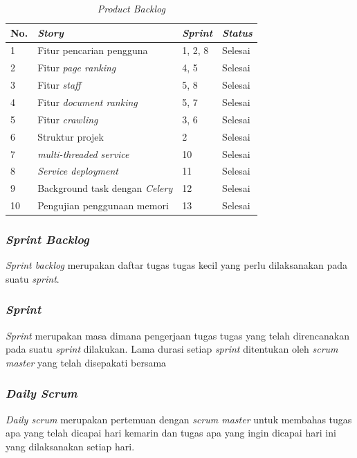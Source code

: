 \documentclass[
	a4paper, %
	10pt, %
	unnumberedsections, %
	twoside, %
]{LTJournalArticle}
\begin{document}
\begin{table}[H]
	\centering
	\caption{\textit{Product Backlog}}
	\label{table:productbacklog}
	\begin{tabular}{@{} |p{0.25cm}|p{3cm}| p{1cm} |p{1cm}|@{}}
		\hline
		\textbf{No.} & \textbf{\textit{Story}} & \textbf{\textit{Sprint}} & \textbf{\textit{Status}} \\
		\hline
		1 & Fitur pencarian pengguna & 1, 2, 8 & Selesai \\
		\hline
		2 & Fitur \textit{page ranking} & 4, 5 & Selesai\\
		\hline
		3 & Fitur \textit{staff} & 5, 8 & Selesai\\
		\hline
		4 & Fitur \textit{document ranking} & 5, 7  & Selesai\\
		\hline
		5 & Fitur \textit{crawling} & 3, 6 & Selesai\\
		\hline
		6 & Struktur projek & 2 & Selesai\\
		\hline
		7 & \textit{multi-threaded service} & 10  & Selesai\\
		\hline
		8 & \textit{Service deployment} & 11  & Selesai\\
		\hline
		9 & Background task dengan \textit{Celery} & 12  & Selesai\\
		\hline
		10 & Pengujian penggunaan memori & 13  & Selesai\\
		\hline
	\end{tabular}
\end{table}

\subsubsection{\textit{Sprint Backlog}}
\textit{Sprint backlog} merupakan daftar tugas tugas kecil yang perlu dilaksanakan pada suatu \textit{sprint}.

\subsubsection{\textit{Sprint}}
\textit{Sprint} merupakan masa dimana pengerjaan tugas tugas yang telah direncanakan pada suatu \textit{sprint} dilakukan. Lama durasi setiap \textit{sprint} ditentukan oleh \textit{scrum} \textit{master} yang telah disepakati bersama

\subsubsection{\textit{Daily Scrum}}
\textit{Daily scrum} merupakan pertemuan dengan \textit{scrum master} untuk membahas tugas apa yang telah dicapai hari kemarin dan tugas apa yang ingin dicapai hari ini yang dilaksanakan setiap hari.
\end{document}
